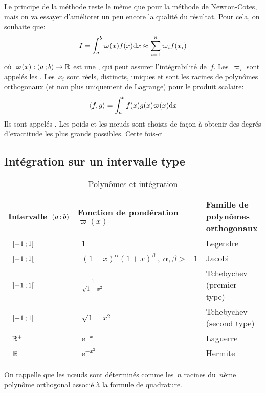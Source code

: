 Le principe de la méthode reste le même que pour la méthode de Newton-Cotes, mais on va essayer d'améliorer un peu encore la qualité du résultat. Pour cela, on souhaite que: 
\begin{equation}
I=\int_a^b \varpi(x)f(x)\text{d} x \approx \sum_{i=1}^n \varpi_if(x_i)
\end{equation}
où~$\varpi(x): \mathopen{(}a\,;b\mathclose{)}\rightarrow\mathbb R$ est une , qui peut assurer l'intégrabilité de~$f$. Les~$\varpi_i$ sont appelés les . Les~$x_i$ sont réels, distincts, uniques et sont les racines de polynômes orthogonaux (et non plus uniquement de Lagrange) pour le produit scalaire:
\begin{equation}
\left\langle f,g \right\rangle = \int_a^b f(x)g(x) \varpi(x) \text{d} x
\end{equation}
Ils sont appelés . Les poids et les nœuds sont choisis de façon à obtenir des degrés d'exactitude les plus grands possibles. Cette fois-ci  

\medskip
\subsection*{Intégration sur un intervalle type} 

\begin{table}[ht]\centering\small
\begin{tabular}{lll} Intervalle~$\mathopen{(}a\,;b\mathclose{)}$ & Fonction de pondération~$\varpi(x)$ & Famille de polynômes orthogonaux\\ \hline~$\mathopen{[}-1\,;1\mathclose{]}$ &~$1$ & Legendre\\~$\mathopen{]}-1\,;1\mathclose{[}$ &~$(1-x)^\alpha (1+x)^\beta \ , \ \alpha, \beta > -1$ & Jacobi\\~$\mathopen{]}-1\,;1\mathclose{[}$ &~$\frac{1}{\sqrt{1-x^2}}$ &Tchebychev (premier type)\\~$\mathopen{]}-1\,;1\mathclose{[}$ &~$\sqrt{1-x^2}$ & Tchebychev (second type)\\~$\mathbb R^+$ &~$\mathrm{e}^{-x}$ & Laguerre\\~$\mathbb R$ &~$\mathrm{e}^{-x^2}$ & Hermite\\ \hline
\end{tabular} 
\caption{Polynômes et intégration}
\end{table} 
On rappelle que les nœuds sont déterminés comme les~$n$ racines du~$n$ème polynôme orthogonal associé à la formule de quadrature. 
 

